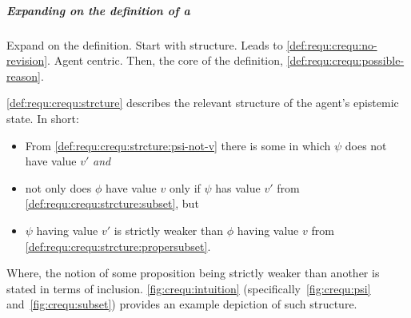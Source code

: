 \subparagraph{Expanding on the definition of a \crequ{}}

\begin{note}
  Expand on the definition.
  Start with structure.
  Leads to \ref{def:requ:crequ:no-revision}.
  Agent centric.
  Then, the core of the definition, \ref{def:requ:crequ:possible-reason}.
\end{note}


\begin{note}
  \ref{def:requ:crequ:strcture} describes the relevant structure of the agent's epistemic state.
  In short:
  \begin{itemize}
  \item
    From \ref{def:requ:crequ:strcture:psi-not-v} there is some \epVAd{} in which \(\psi\) does not have value \(v'\) \emph{and}
  \item
    not only does \(\phi\) have value \(v\) only if \(\psi\) has value \(v'\) from \ref{def:requ:crequ:strcture:subset}, but
  \item
    \(\psi\) having value \(v'\) is strictly weaker than \(\phi\) having value \(v\) from \ref{def:requ:crequ:strcture:propersubset}.
  \end{itemize}
  Where, the notion of some proposition being strictly weaker than another is stated in terms of inclusion.
  \autoref{fig:crequ:intuition} (specifically~\autoref{fig:crequ:psi} and~\autoref{fig:crequ:subset}) provides an example depiction of such structure.
\end{note}

